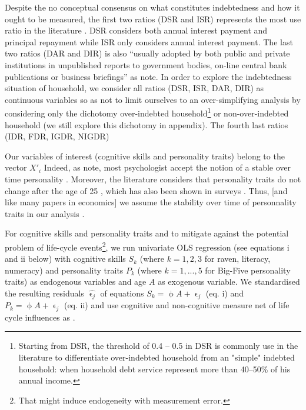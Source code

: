 \documentclass[a4paper, 11pt, onecolumn]{article}
\begin{document}
Despite the no conceptual consensus on what constitutes indebtedness and how it ought to be measured, the first two ratios (DSR and ISR) represents the most use ratio in the literature \citep{Chichaibelu2017, DAlessio2013, OXERA2004}. 
DSR considers both annual interest payment and principal repayment while ISR only considers annual interest payment.
The last two ratios (DAR and DIR) \citep{Disney2008, Rio2008} is also ``usually adopted by both public and private institutions in unpublished reports to government bodies, on-line central bank publications or business briefings'' as \cite{Betti2007} note.
In order to explore the indebtedness situation of household, we consider all ratios (DSR, ISR, DAR, DIR) as continuous variables so as not to limit ourselves to an over-simplifying analysis by considering only the dichotomy over-indebted household\footnote{Starting from DSR, the threshold of 0.4 -- 0.5 in DSR is commonly use in the literature to differentiate over-indebted household from an "simple" indebted household:  when household debt service represent more than 40--50\% of his annual income.} or non-over-indebted household (we still explore this dichotomy in appendix).
The fourth last ratios (IDR, FDR, IGDR, NIGDR)

Our variables of interest (cognitive skills and personality traits) belong to the vector $X'_i$ 
Indeed, as \cite{Almlund2011} note, most psychologist accept the notion of a stable over time personality \cite{Mischel1995, Mischel2008}.
Moreover, the literature considers that personality traits do not change after the age of 25 \citep{CobbClark2012}, which has also been shown in surveys \citep{CobbClark2011}.
Thus, [and like many papers in economics] we assume the stability over time of personnality traits in our analysis \citep{Nyhus2005, Brown2014, Heineck2010}. 


For cognitive skills and personality traits and to mitigate against the potential problem of life-cycle events\footnote{That might induce endogeneity with measurement error.}, we run univariate OLS regression (see equations i and ii below) with  cognitive skills $S_k$ (where $k=1, 2, 3$ for raven, literacy, numeracy) and personality traits $P_k$ (where $k=1,...,5$ for Big-Five personality traits) as endogenous variables and age $A$ as exogenous variable.
We standardised the resulting residuals $\hat{\upvarepsilon_j}$ of equations $S_k=\upphi A+\upvarepsilon_j$ (eq. i) and $P_k=\upphi A+\upvarepsilon_j$ (eq. ii) and use cognitive and non-cognitive measure net of life cycle influences as \cite{Nyhus2005, Brown2014}.
\end{document}

